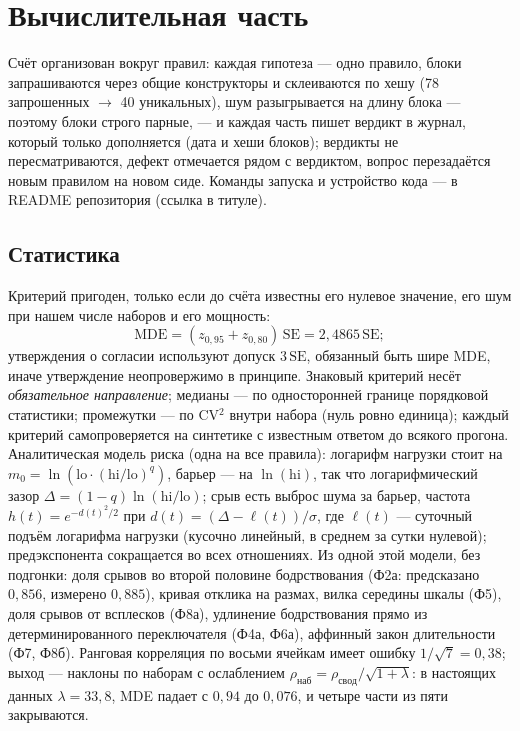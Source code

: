 \documentclass[11pt,a4paper]{article}
\theoremstyle{remark}
\begin{document}
\section{Вычислительная часть}\label{sec:code}
Счёт организован вокруг правил: каждая гипотеза --- одно правило, блоки запрашиваются
через общие конструкторы и склеиваются по хешу (78 запрошенных $\to$ 40 уникальных), шум
разыгрывается на длину блока --- поэтому блоки строго парные, --- и каждая часть пишет
вердикт в журнал, который только дополняется (дата и хеши блоков); вердикты не
пересматриваются, дефект отмечается рядом с вердиктом, вопрос перезадаётся новым
правилом на новом сиде. Команды запуска и устройство кода --- в README репозитория
(ссылка в титуле).

\subsection{Статистика}\label{sec:stats}
Критерий пригоден, только если до счёта известны его нулевое значение, его шум при
нашем числе наборов и его мощность:
\begin{equation}\label{eq:mde}
\mathrm{MDE}=(z_{0{,}95}+z_{0{,}80})\,\mathrm{SE}=2{,}4865\,\mathrm{SE};
\end{equation}
утверждения о согласии используют допуск $3\,\mathrm{SE}$, обязанный быть шире MDE,
иначе утверждение неопровержимо в принципе. Знаковый критерий несёт \emph{обязательное
направление}; медианы --- по односторонней границе порядковой статистики; промежутки --- по CV$^2$
внутри набора (нуль ровно единица); каждый критерий самопроверяется на синтетике с
известным ответом до всякого прогона. Аналитическая модель риска (одна на все правила):
логарифм нагрузки стоит на $m_0=\ln(\mathrm{lo}\cdot(\mathrm{hi}/\mathrm{lo})^q)$,
барьер --- на $\ln(\mathrm{hi})$, так что логарифмический зазор
$\Delta=(1-q)\ln(\mathrm{hi}/\mathrm{lo})$; срыв есть выброс шума за барьер, частота
$h(t)=e^{-d(t)^2/2}$ при $d(t)=(\Delta-\ell(t))/\sigma$, где $\ell(t)$ --- суточный
подъём логарифма нагрузки (кусочно линейный, в среднем за сутки нулевой);
предэкспонента сокращается во всех отношениях. Из одной этой модели, без подгонки: доля срывов во второй половине
бодрствования (Ф2а: предсказано $0{,}856$, измерено $0{,}885$), кривая отклика на размах, вилка середины шкалы (Ф5),
доля срывов от всплесков (Ф8а), удлинение бодрствования прямо из детерминированного
переключателя (Ф4а, Ф6а), аффинный закон длительности (Ф7, Ф8б). Ранговая корреляция по
восьми ячейкам имеет ошибку $1/\sqrt{7}=0{,}38$; выход --- наклоны по наборам с
ослаблением $\rho_{\mathrm{наб}}=\rho_{\mathrm{свод}}/\sqrt{1+\lambda}$: в настоящих
данных $\lambda=33{,}8$, MDE падает с $0{,}94$ до $0{,}076$, и четыре части из пяти
закрываются.
\end{document}
